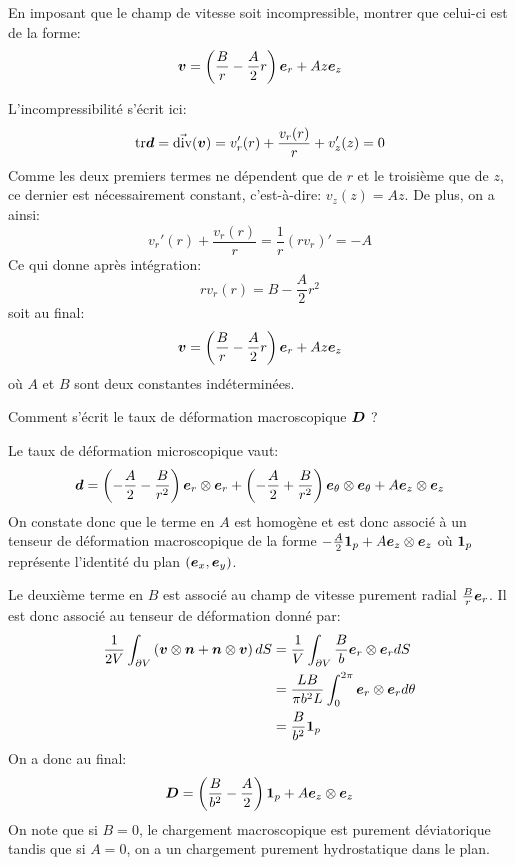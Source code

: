 \documentclass[french,english,12pt]{exam}
\begin{document}
\begin{questions}
\question En imposant que le champ de vitesse soit incompressible, montrer que celui-ci est de la forme:\\
\begin{equation}
  \boldsymbol{v} = \left( \frac{B}{r} -  \frac{A}{2}r \right)  \boldsymbol{e}_r +  A z \boldsymbol{e}_z 
\end{equation}
\begin{solution}
L'incompressibilité s'écrit ici:
$$\mathrm{tr}\boldsymbol{d} = \vec{\mathrm{div}}{\left(\boldsymbol{v}\right)} = v_r'(r)+\dfrac{v_r(r)}{r}+v_z'(z)=0$$
Comme les deux premiers termes ne dépendent que de $r$ et le troisième que de $z$, ce dernier est nécessairement constant, c'est-à-dire: $v_z(z) = Az$. De plus, on a ainsi:
$$v_r'(r)+\dfrac{v_r(r)}{r}= \dfrac{1}{r}(rv_r)'=-A$$
Ce qui donne après intégration:
$$rv_r(r) = B -  \frac{A}{2}r^2$$
soit au final:
\begin{equation}
  \boldsymbol{v} = \left( \frac{B}{r} -  \frac{A}{2}r \right)  \boldsymbol{e}_r +  A z \boldsymbol{e}_z 
\end{equation}
où $A$ et $B$ sont deux constantes indéterminées.
\end{solution}

\question Comment s'écrit le taux de déformation macroscopique $\boldsymbol{D}$ ? \\
\begin{solution}
Le taux de déformation microscopique vaut:
$$\boldsymbol{d} = \left(-\frac{A}{2}-\frac{B}{r^2}\right)\boldsymbol{e}_r\otimes\boldsymbol{e}_r + \left(-\frac{A}{2}+\frac{B}{r^2}\right)\boldsymbol{e}_\theta\otimes\boldsymbol{e}_\theta + A\boldsymbol{e}_z\otimes\boldsymbol{e}_z$$
On constate donc que le terme en $A$ est homogène et est donc associé à un tenseur de déformation macroscopique de la forme $-\frac{A}{2}\boldsymbol{1}_p + A\boldsymbol{e}_z\otimes\boldsymbol{e}_z$ où $\boldsymbol{1}_p$ représente l'identité du plan $(\boldsymbol{e}_x,\boldsymbol{e}_y)$. 

Le deuxième terme en $B$ est associé au champ de vitesse purement radial $\frac{B}{r}\boldsymbol{e}_r$. Il est donc associé au tenseur de déformation donné par:
\begin{align*}
\frac{1}{2V} \int_{\partial V} \left(\boldsymbol{v} \otimes \boldsymbol{n} + \boldsymbol{n} \otimes \boldsymbol{v}     \right) dS &= \frac{1}{V}\int_{\partial V} \dfrac{B}{b} \boldsymbol{e}_r\otimes\boldsymbol{e}_r dS \\
&= \dfrac{L B}{\pi b^2 L} \int_0^{2\pi}\boldsymbol{e}_r\otimes\boldsymbol{e}_r d\theta\\
&= \dfrac{B}{b^2} \boldsymbol{1}_p
\end{align*}
On a donc au final:
$$\boldsymbol{D} = \left(\dfrac{B}{b^2}- \dfrac{A}{2}\right)\boldsymbol{1}_p + A\boldsymbol{e}_z\otimes\boldsymbol{e}_z$$
On note que si $B=0$, le chargement macroscopique est purement déviatorique tandis que si $A=0$, on a un chargement purement hydrostatique dans le plan.
\end{solution}


\end{questions}
\end{document}
